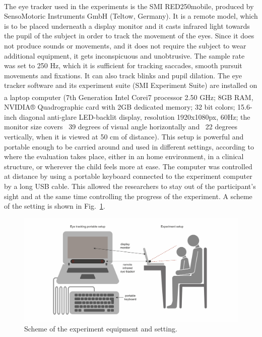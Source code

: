 The eye tracker used in the experiments is the SMI\textsuperscript{\textregistered} RED250mobile\texttrademark, produced by SensoMotoric Instruments GmbH (Teltow, Germany). It is a remote model, which is to be placed underneath a display monitor and it casts infrared light towards the pupil of the subject in order to track the movement of the eyes. Since it does not produce sounds or movements, and it does not require the subject to wear additional equipment, it gets inconspicuous and unobtrusive. The sample rate was set to 250 Hz, which it is sufficient for tracking saccades, smooth pursuit movements and fixations. It can also track blinks and pupil dilation. The eye tracker software and its experiment suite (SMI Experiment Suite) are installed on a laptop computer (7th Generation Intel\textsuperscript{\textregistered} Core\texttrademark i7 processor 2.50 GHz; 8GB RAM, NVIDIA® Quadro\texttrademark graphic card with 2GB dedicated memory; 32 bit colors; 15.6-inch diagonal anti-glare LED-backlit display, resolution 1920x1080px, 60Hz; the monitor size covers ~39 degrees of visual angle horizontally and ~22 degrees vertically, when it is viewed at 50 cm of distance). This setup is powerful and portable enough to be carried around and used in different settings, according to where the evaluation takes place, either in an home environment, in a clinical structure, or wherever the child feels more at ease.
The computer was controlled at distance by using a portable keyboard connected to the experiment computer by a long USB cable. This allowed the researchers to stay out of the participant’s sight and at the same time controlling the progress of the experiment. A scheme of the setting is shown in Fig.~\ref{fig:settingscheme}.

\begin{figure}[h]
  \centering
  \includegraphics[width=1\textwidth]{figures/setting-01.jpg}
  \caption[experiment setting scheme]{Scheme of the experiment equipment and setting.}
  \label{fig:settingscheme}
\end{figure}

